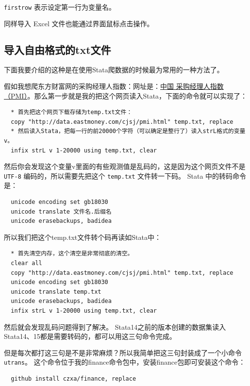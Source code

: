 \documentclass[cn,fancy,blue,11pt]{elegantbook}
\begin{document}
\texttt{firstrow} 表示设定第一行为变量名。

同样导入 Excel 文件也能通过界面鼠标点击操作。

\subsection{导入自由格式的txt文件}

下面我要介绍的这种是在使用Stata爬数据的时候最为常用的一种方法了。

假如我想爬东方财富网的采购经理人指数：网址是：\href{http://data.eastmoney.com/cjsj/pmi.html}{中国 采购经理人指数（PMI）}。那么第一步就是我的把这个网页读入Stata，下面的命令就可以实现了：

\begin{lstlisting}
  * 首先把这个网页下载存储为temp.txt文件：
  copy "http://data.eastmoney.com/cjsj/pmi.html" temp.txt, replace
  * 然后读入Stata，把每一行的前20000个字符（可以确定是整行了）读入strL格式的变量v。
  infix strL v 1-20000 using temp.txt, clear
\end{lstlisting}

然后你会发现这个变量v里面的有些观测值是乱码的，这是因为这个网页文件不是 \texttt{UTF-8} 编码的，所以需要先把这个 \texttt{temp.txt} 文件转一下码。 Stata 中的转码命令是：

\begin{lstlisting}
  unicode encoding set gb18030
  unicode translate 文件名.后缀名
  unicode erasebackups, badidea
\end{lstlisting}

所以我们把这个temp.txt文件转个码再读如Stata中：

\begin{lstlisting}
  * 首先清空内存，这个清空是非常彻底的清空。
  clear all
  copy "http://data.eastmoney.com/cjsj/pmi.html" temp.txt, replace
  unicode encoding set gb18030
  unicode translate temp.txt
  unicode erasebackups, badidea
  infix strL v 1-20000 using temp.txt, clear
\end{lstlisting}

然后就会发现乱码问题得到了解决。
Stata14之前的版本创建的数据集读入Stata14、15都是需要转码的，都可以用这三句命令完成。

但是每次都打这三句是不是非常麻烦？所以我简单把这三句封装成了一个小命令\texttt{utrans}。
这个命令位于我的finance命令包中，安装finance包即可安装这个命令：

\begin{lstlisting}
  github install czxa/finance, replace
\end{lstlisting}
\end{document}
